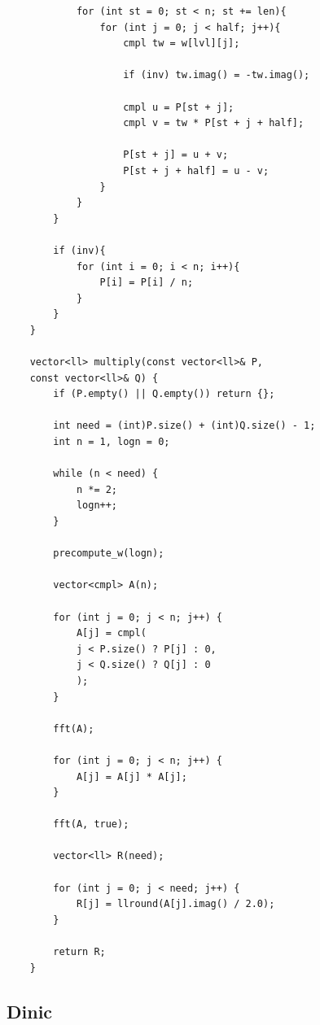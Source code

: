 \documentclass[10pt,a4paper]{article}
\begin{document}
\begin{lstlisting}
			for (int st = 0; st < n; st += len){
				for (int j = 0; j < half; j++){
					cmpl tw = w[lvl][j];
					
					if (inv) tw.imag() = -tw.imag();
					
					cmpl u = P[st + j];
					cmpl v = tw * P[st + j + half];
					
					P[st + j] = u + v;
					P[st + j + half] = u - v;
				}
			}
		}
		
		if (inv){
			for (int i = 0; i < n; i++){
				P[i] = P[i] / n;
			}
		}
	}
	
	vector<ll> multiply(const vector<ll>& P,
	const vector<ll>& Q) {
		if (P.empty() || Q.empty()) return {};
		
		int need = (int)P.size() + (int)Q.size() - 1;
		int n = 1, logn = 0;
		
		while (n < need) {
			n *= 2;
			logn++;
		}
		
		precompute_w(logn);
		
		vector<cmpl> A(n);
		
		for (int j = 0; j < n; j++) {
			A[j] = cmpl(
			j < P.size() ? P[j] : 0,
			j < Q.size() ? Q[j] : 0
			);
		}
		
		fft(A);
		
		for (int j = 0; j < n; j++) {
			A[j] = A[j] * A[j];
		}
		
		fft(A, true);
		
		vector<ll> R(need);
		
		for (int j = 0; j < need; j++) {
			R[j] = llround(A[j].imag() / 2.0);
		}
		
		return R;
	}
\end{lstlisting}

\subsection{Dinic}
\end{document}
